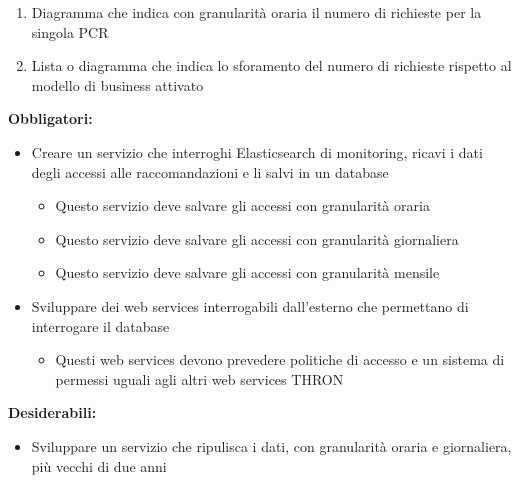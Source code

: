 \documentclass[a4paper, 12pt, twoside, openright]{book}
\begin{document}
\begin{enumerate}
	\item Diagramma che indica con granularità oraria il numero di richieste per la singola PCR
	\item Lista o diagramma che indica lo sforamento del numero di richieste rispetto al modello di business attivato
\end{enumerate}

\textbf{Obbligatori:}
\begin{itemize}
	\item Creare un servizio che interroghi Elasticsearch di monitoring, ricavi i dati degli accessi alle raccomandazioni e li salvi in un database
	\begin{itemize}
		\item Questo servizio deve salvare gli accessi con granularità oraria
		\item Questo servizio deve salvare gli accessi con granularità giornaliera
		\item Questo servizio deve salvare gli accessi con granularità mensile
	\end{itemize}
	\item Sviluppare dei web services interrogabili dall'esterno che permettano di interrogare il database
	\begin{itemize}
		\item Questi web services devono prevedere politiche di accesso e un sistema di permessi uguali agli altri web services THRON
	\end{itemize}
\end{itemize}
\textbf{Desiderabili:}
\begin{itemize}
	\item Sviluppare un servizio che ripulisca i dati, con granularità oraria e giornaliera, più vecchi di due anni
\end{itemize}

\end{document}
